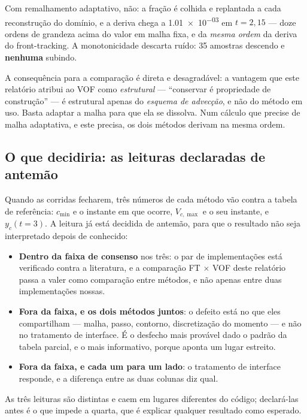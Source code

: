 Com remalhamento adaptativo, n\~ao: a fra\c{c}\~ao \'e colhida e replantada a cada
reconstru\c{c}\~ao do dom\'inio, e a deriva chega a \num{1.01e-03} em
$t=2{,}15$ --- doze ordens de grandeza acima do valor em malha fixa, e da
\emph{mesma ordem} da deriva do front-tracking. A monotonicidade descarta ru\'ido:
35 amostras descendo e \textbf{nenhuma} subindo.

A consequ\^encia para a compara\c{c}\~ao \'e direta e desagrad\'avel: a vantagem
que este relat\'orio atribui ao VOF como \emph{estrutural} --- ``conservar \'e
propriedade de constru\c{c}\~ao'' --- \'e estrutural apenas do \emph{esquema de
advec\c{c}\~ao}, e n\~ao do m\'etodo em uso. Basta adaptar a malha para que ela se
dissolva. Num c\'alculo que precise de malha adaptativa, e este precisa, os dois
m\'etodos derivam na mesma ordem.

\subsection{O que decidiria: as leituras declaradas de antem\~ao}
\label{sec:leituras}

Quando as corridas fecharem, tr\^es n\'umeros de cada m\'etodo v\~ao contra a
tabela de refer\^encia: $c_{\min}$ e o instante em que ocorre, $V_{c,\max}$ e o
seu instante, e $y_c(t=3)$. A leitura j\'a est\'a decidida de antemão, para que
o resultado n\~ao seja interpretado depois de conhecido:

\begin{itemize}
  \item \textbf{Dentro da faixa de consenso} nos tr\^es: o par de
    implementa\c{c}\~oes est\'a verificado contra a literatura, e a compara\c{c}\~ao
    FT $\times$ VOF deste relat\'orio passa a valer como compara\c{c}\~ao entre
    m\'etodos, e n\~ao apenas entre duas implementa\c{c}\~oes nossas.
  \item \textbf{Fora da faixa, e os dois m\'etodos juntos}: o defeito est\'a no
    que eles compartilham --- malha, passo, contorno, discretiza\c{c}\~ao do
    momento --- e n\~ao no tratamento de interface. \'E o desfecho mais
    prov\'avel dado o padr\~ao da tabela parcial, e o mais informativo, porque
    aponta um lugar estreito.
  \item \textbf{Fora da faixa, e cada um para um lado}: o tratamento de interface
    responde, e a diferen\c{c}a entre as duas colunas diz qual.
\end{itemize}

As tr\^es leituras s\~ao distintas e caem em lugares diferentes do c\'odigo;
declar\'a-las antes \'e o que impede a quarta, que \'e explicar qualquer
resultado como esperado.

